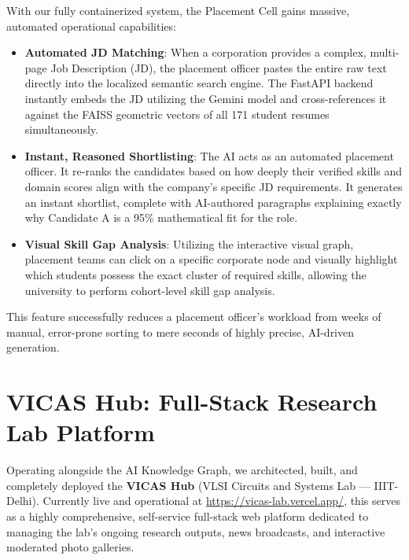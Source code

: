 \documentclass[12pt,a4paper]{report}
\begin{document}
With our fully containerized system, the Placement Cell gains massive, automated operational capabilities:
\begin{itemize}
    \item \textbf{Automated JD Matching}: When a corporation provides a complex, multi-page Job Description (JD), the placement officer pastes the entire raw text directly into the localized semantic search engine. The FastAPI backend instantly embeds the JD utilizing the Gemini model and cross-references it against the FAISS geometric vectors of all 171 student resumes simultaneously.
    \item \textbf{Instant, Reasoned Shortlisting}: The AI acts as an automated placement officer. It re-ranks the candidates based on how deeply their verified skills and domain scores align with the company's specific JD requirements. It generates an instant shortlist, complete with AI-authored paragraphs explaining exactly why Candidate A is a 95\% mathematical fit for the role.
    \item \textbf{Visual Skill Gap Analysis}: Utilizing the interactive visual graph, placement teams can click on a specific corporate node and visually highlight which students possess the exact cluster of required skills, allowing the university to perform cohort-level skill gap analysis.
\end{itemize}

This feature successfully reduces a placement officer's workload from weeks of manual, error-prone sorting to mere seconds of highly precise, AI-driven generation.

\section{VICAS Hub: Full-Stack Research Lab Platform}

Operating alongside the AI Knowledge Graph, we architected, built, and completely deployed the \textbf{VICAS Hub} (VLSI Circuits and Systems Lab — IIIT-Delhi). Currently live and operational at \url{https://vicas-lab.vercel.app/}, this serves as a highly comprehensive, self-service full-stack web platform dedicated to managing the lab's ongoing research outputs, news broadcasts, and interactive moderated photo galleries.
\end{document}
